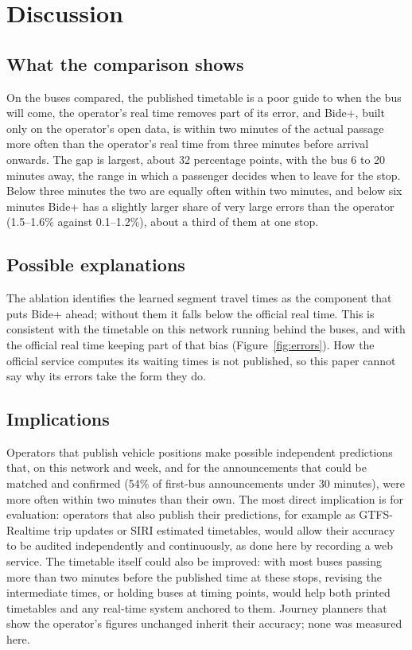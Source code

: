 \section{Discussion}
\label{sec:discussion}

\subsection{What the comparison shows}

On the buses compared, the published timetable is a poor guide to when the bus will come, the operator's real time removes
part of its error, and Bide+, built only on the operator's open data, is within two minutes of the actual passage more
often than the operator's real time from three minutes before arrival onwards. The gap is largest, about 32 percentage
points, with the bus 6 to 20 minutes away, the range in which a passenger decides when to leave for the stop. Below three
minutes the two are equally often within two minutes, and below six minutes Bide+ has a slightly larger share of very large errors
than the operator (1.5--1.6\% against 0.1--1.2\%), about a third of them at one stop.

\subsection{Possible explanations}

The ablation identifies the learned segment travel times as the component that puts Bide+ ahead; without them it falls
below the official real time. This is consistent with the timetable on this network running behind the buses, and with the
official real time keeping part of that bias (Figure~\ref{fig:errors}). How the official service computes its waiting
times is not published, so this paper cannot say why its errors take the form they do.

\subsection{Implications}

Operators that publish vehicle positions make possible independent predictions that, on this network and week, and for
the announcements that could be matched and confirmed (54\% of first-bus announcements under 30 minutes), were more often within two minutes than their own. The most
direct implication is for evaluation: operators that also publish their predictions, for example as GTFS-Realtime trip
updates \parencite{gtfsrt} or SIRI estimated timetables, would allow their accuracy to be audited independently and
continuously, as done here by recording a web service. The timetable itself could also be improved: with most buses passing more than two minutes before the published time at
these stops, revising the intermediate times, or holding buses at timing points, would help both printed timetables and
any real-time system anchored to them. Journey planners that show the operator's figures unchanged inherit
their accuracy; none was measured here.

